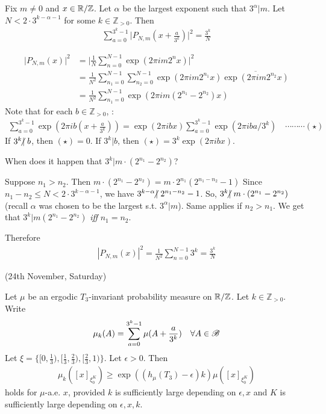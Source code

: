 \documentclass[12pt,a4paper]{report}
\newenvironment{proof}
{\begin{changemargin}{1cm}{0.5cm} 
	}%
	{\end{changemargin}
}
\newenvironment{subproof}
{\begin{changemargin}{0.5cm}{0.5cm}
	}%
	{\end{changemargin}
}
\begin{document}
\lem Fix $m\neq 0$ and $x\in \mathbb{R}/\mathbb{Z}$. Let $\alpha$ be the largest exponent such that $3^{\alpha} | m$. Let $N < 2\cdot 3^{k-\alpha -1}$ for some $k\in \mathbb{Z}_{>0}$. Then
\begin{align*}
\sum_{a=0}^{3^{k}-1} \big| P_{N,m}(x + \frac{a}{3^k}) \big|^2 = \frac{3^k}{N}
\end{align*}
\begin{proof}
\pf \begin{align*}
\big| P_{N,m}(x) \big|^2 &= \big| \frac{1}{N} \sum_{n=0}^{N-1} \exp(2\pi i m 2^n x) \big|^2 \\
&= \frac{1}{N^2} \sum_{n_1=0}^{N-1} \sum_{n_2=0}^{N-1} \exp(2\pi im2^{n_1} x) \overline{\exp(2\pi im2^{n_2} x)} \\
&= \frac{1}{N^2} \sum_{n_1=0}^{N-1} \exp(2\pi i m(2^{n_1} - 2^{n_2}) x)
\end{align*}
Note that for each $b\in \mathbb{Z}_{>0}$, :
\begin{align*}
\sum_{a=0}^{3^k-1} \exp(2\pi ib(x+ \frac{a}{3^k})) = \exp(2\pi i bx) \sum_{a=0}^{3^k -1} \exp(2\pi iba/3^k) \quad \cdots \cdots\cdots (\star)
\end{align*}
If $3^k \hspace{-5pt}\not|\hspace{3pt} b$, then $(\star)=0$. If $3^k | b$, then $(\star) = 3^k \exp(2\pi ibx)$.
\s

When does it happen that $3^k | m \cdot (2^{n_1} - 2^{n_2})$?
\begin{subproof}
Suppose $n_1>n_2$. Then $m\cdot (2^{n_1} - 2^{n_2}) = m\cdot 2^{n_1}(2^{n_1 - n_2} -1)$ Since $n_1-n_2 \leq N < 2\cdot 3^{k - \alpha -1}$, we have $3^{k-\alpha} \hspace{-5pt}\not|\hspace{3pt} 2^{n_1-n_2} - 1$. So, $3^k \hspace{-5pt}\not|\hspace{3pt} m\cdot (2^{n_1} - 2^{n_2})$ (recall $\alpha$ was chosen to be the largest s.t. $3^{\alpha} | m$). Same applies if $n_2 >n_1$. We get that $3^k | m(2^{n_1}-2^{n_2})$ \emph{iff} $n_1 =n_2$.
\end{subproof}
Therefore
\begin{align*}
|P_{N,m}(x)|^2 = \frac{1}{N^2} \sum_{n=0}^{N-1} 3^k = \frac{3^k}{N} 
\end{align*}

\eop
\end{proof}
\s

\newday

(24th November, Saturday)
\s

\prop Let $\mu$ be an ergodic $T_{3}$-invariant probability measure on $\mathbb{R}/\mathbb{Z}$. Let $k\in \mathbb{Z}_{>0}$. Write
\begin{align*}
\mu_k(A) = \sum_{a=0}^{3^k-1} \mu(A + \frac{a}{3^k}) \quad \forall A \in \mathscr{B}
\end{align*}
Let $\xi = \{[0,\frac{1}{3}), [\frac{1}{3},\frac{2}{3}), [\frac{2}{3},1) \}$. Let $\epsilon>0$. Then
\begin{align*}
\mu_{k}([x]_{\xi_0^K}) \geq \exp( (h_{\mu}(T_3)-\epsilon)k) \mu([x]_{\xi_0^K})
\end{align*}
holds for $\mu$-a.e. $x$, provided $k$ is sufficiently large depending on $\epsilon, x$ and $K$ is sufficiently large depending on $\epsilon, x,k$.
\end{document}
